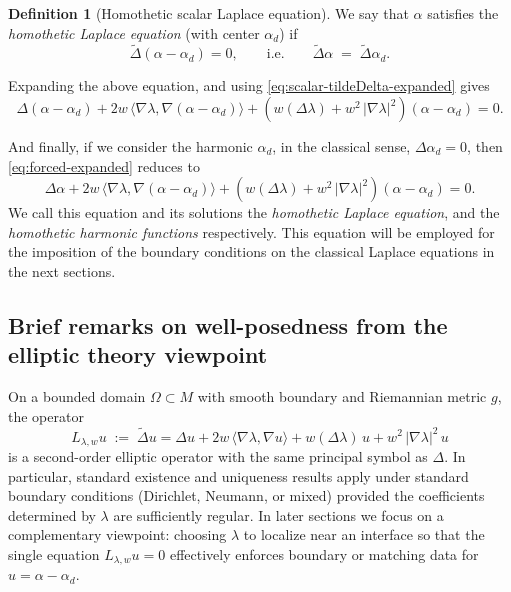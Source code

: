 \documentclass[preprint,12pt]{elsarticle}
\theoremstyle{plain}
\theoremstyle{definition}
\newtheorem{definition}[theorem]{Definition}
\theoremstyle{note}
\newcommand{\grad}{\nabla}
\newcommand{\wtD}{\tilde\Delta}
\begin{document}
\begin{definition}[Homothetic scalar Laplace equation]\label{def:hom-laplace-scalar}
We say that $\alpha$ satisfies the \emph{homothetic Laplace equation} (with center $\alpha_d$) if
\begin{equation}\label{eq:hom-laplace-u}
\wtD(\alpha-\alpha_d)=0, \qquad\text{i.e.} \qquad \wtD \alpha \;=\; \wtD\alpha_d.
\end{equation}
\end{definition}
\noindent
Expanding the above equation, and using \eqref{eq:scalar-tildeDelta-expanded} gives
\begin{equation}\label{eq:forced-expanded}
\Delta (\alpha-\alpha_d) + 2w\,\langle \grad\lambda,\grad (\alpha-\alpha_d)\rangle
+ \left( w(\Delta\lambda) + w^2\,|\grad\lambda|^2 \right)(\alpha-\alpha_d) = 0.
\end{equation}

And finally, if we consider the harmonic $\alpha_d$, in the classical sense, $\Delta\alpha_d=0$, then \eqref{eq:forced-expanded} reduces to
\begin{equation}\label{eq:forced-alpha-d-harmonic}
\boxed{
\Delta \alpha + 2w\,\langle \grad\lambda,\grad (\alpha-\alpha_d)\rangle
+ \left( w(\Delta\lambda) + w^2\,|\grad\lambda|^2 \right)(\alpha-\alpha_d) = 0.}
\end{equation}
We call this equation and its solutions the \emph{homothetic Laplace equation}, and the \emph{homothetic harmonic functions} respectively. This equation will be employed for the imposition of the boundary conditions on the classical Laplace equations in the next sections. 

\subsection{Brief remarks on well-posedness from the elliptic theory viewpoint}
On a bounded domain $\Omega\subset M$ with smooth boundary and Riemannian metric $g$, the operator
\begin{equation}\label{eq:Lu}
L_{\lambda,w}u \;:=\; \wtD u
=
\Delta u
+ 2w\,\langle \grad\lambda,\grad u\rangle
+ w(\Delta\lambda)\,u
+ w^2\,|\grad\lambda|^2\,u
\end{equation}
is a second-order elliptic operator with the same principal symbol as $\Delta$.
In particular, standard existence and uniqueness results apply under standard boundary conditions (Dirichlet, Neumann, or mixed) provided the coefficients determined by $\lambda$ are sufficiently regular.
In later sections we focus on a complementary viewpoint: choosing $\lambda$ to localize near an interface so that the single equation $L_{\lambda,w}u=0$ effectively enforces boundary or matching data for $u=\alpha-\alpha_d$.
\end{document}
